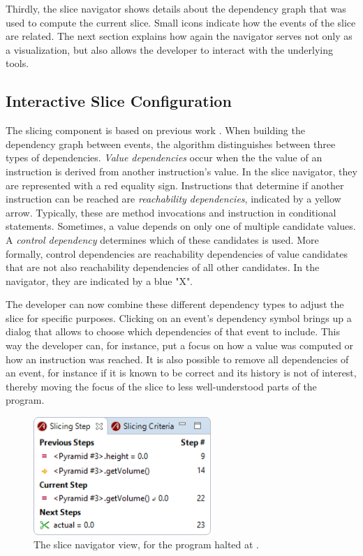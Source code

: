 ﻿\documentclass[
      english,
      ]{llncs}
\begin{document}
Thirdly, the slice navigator shows details about the dependency graph that was used to compute the current slice.
Small icons indicate how the events of the slice are related.
The next section explains how again the navigator serves not only as a visualization, but also allows the developer to interact with the underlying tools.

\subsection{Interactive Slice Configuration}

The slicing component is based on previous work \todo{[xxx]}.
When building the dependency graph between events, the algorithm distinguishes between three types of dependencies.
\emph{Value dependencies} occur when the the value of an instruction is derived from another instruction's value.
In the slice navigator, they are represented with a red equality sign.
Instructions that determine if another instruction can be reached are \emph{reachability dependencies}, indicated by a yellow arrow.
Typically, these are method invocations and instruction in conditional statements.
Sometimes, a value depends on only one of multiple candidate values. 
A \emph{control dependency} determines which of these candidates is used.
More formally, control dependencies are reachability dependencies of value candidates that are not also reachability dependencies of all other candidates.
In the navigator, they are indicated by a blue "X".

The developer can now combine these different dependency types to adjust the slice for specific purposes.
Clicking on an event's dependency symbol brings up a dialog that allows to choose which dependencies of that event to include.
This way the developer can, for instance, put a focus on how a value was computed or how an instruction was reached.
It is also possible to remove all dependencies of an event, for instance if it is known to be correct and its history is not of interest, thereby moving the focus of the slice to less well-understood parts of the program.

\begin{figure}
	\centering
		\includegraphics[width=0.60\textwidth]{slice2.png}
	\caption{The slice navigator view, for the program halted at .}
	\label{fig:slice2}
\end{figure}
\end{document}
